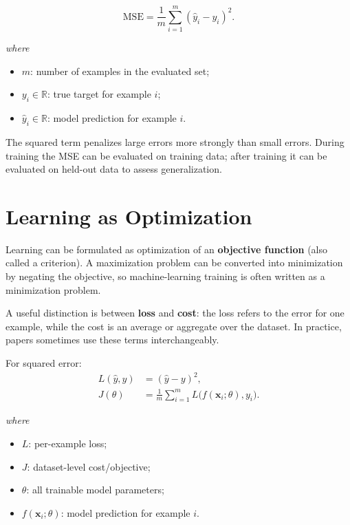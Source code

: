 \documentclass[11pt,a4paper]{report}
\newcommand{\vect}[1]{\bm{#1}}
\newcommand{\R}{\mathbb{R}}
\newcommand{\wherelegend}{\par\smallskip\textit{where}\vspace{-0.3em}}
\begin{document}
\begin{metricbox}[title={Mean Squared Error (MSE)}]
\begin{equation}
  \mathrm{MSE} = \frac{1}{m}\sum_{i=1}^{m}\left(\hat{y}_i-y_i\right)^2.
  \label{eq:mse}
\end{equation}
\wherelegend
\begin{itemize}
  \item $m$: number of examples in the evaluated set;
  \item $y_i\in\R$: true target for example $i$;
  \item $\hat{y}_i\in\R$: model prediction for example $i$.
\end{itemize}
The squared term penalizes large errors more strongly than small errors. During training the MSE can be evaluated on training data; after training it can be evaluated on held-out data to assess generalization.
\end{metricbox}

\section{Learning as Optimization}

Learning can be formulated as optimization of an \textbf{objective function} (also called a criterion). A maximization problem can be converted into minimization by negating the objective, so machine-learning training is often written as a minimization problem.

A useful distinction is between \textbf{loss} and \textbf{cost}: the loss refers to the error for one example, while the cost is an average or aggregate over the dataset. In practice, papers sometimes use these terms interchangeably.

For squared error:
\begin{align}
  L(\hat{y},y) &= (\hat{y}-y)^2,\\
  J(\theta) &= \frac{1}{m}\sum_{i=1}^{m}L\bigl(f(\vect{x}_i;\theta),y_i\bigr).
  \label{eq:cost-general}
\end{align}
\wherelegend
\begin{itemize}
  \item $L$: per-example loss;
  \item $J$: dataset-level cost/objective;
  \item $\theta$: all trainable model parameters;
  \item $f(\vect{x}_i;\theta)$: model prediction for example $i$.
\end{itemize}
\end{document}
